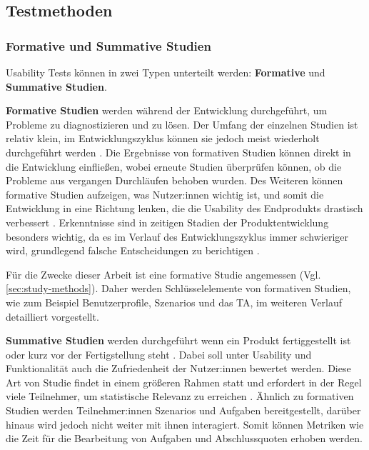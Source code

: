 \subsection{Testmethoden}
\subsubsection{Formative und Summative Studien}
\label{sec:formative-summative}
Usability Tests können in zwei Typen unterteilt werden: \textbf{Formative} und \textbf{Summative
  Studien}.

\vspace{\baselineskip}

\textbf{Formative Studien} werden während der Entwicklung durchgeführt, um Probleme zu diagnostizieren und zu lösen. Der Umfang der einzelnen Studien ist relativ klein, im Entwicklungszyklus können sie jedoch meist wiederholt durchgeführt werden \parencite{barnumUsabilityTesting2021}. Die Ergebnisse von formativen Studien können direkt in die Entwicklung einfließen, wobei erneute Studien überprüfen können, ob die Probleme aus vergangen Durchläufen behoben wurden. Des Weiteren können formative Studien aufzeigen, was Nutzer:innen wichtig ist, und somit die Entwicklung in eine Richtung lenken, die die Usability des Endprodukts drastisch verbessert \parencite{barnumUsabilityTesting2021}. Erkenntnisse sind in zeitigen Stadien der Produktentwicklung besonders wichtig, da es im Verlauf des Entwicklungszyklus immer schwieriger wird, grundlegend falsche Entscheidungen zu berichtigen \parencite{barnumUsabilityTesting2021}.

Für die Zwecke dieser Arbeit ist eine formative Studie angemessen (Vgl. \ref{sec:study-methods}). Daher werden Schlüsselelemente von formativen Studien, wie zum Beispiel Benutzerprofile, Szenarios und das \acl{TA}, im weiteren Verlauf detailliert vorgestellt.

\vspace{\baselineskip}

\textbf{Summative Studien} werden durchgeführt wenn ein Produkt fertiggestellt ist oder kurz vor der Fertigstellung steht \parencite{barnumUsabilityTesting2021}. Dabei soll unter Usability und Funktionalität auch die Zufriedenheit der Nutzer:innen bewertet werden. Diese Art von Studie findet in einem größeren Rahmen statt und erfordert in der Regel viele Teilnehmer, um statistische Relevanz zu erreichen \parencite{barnumUsabilityTesting2021}. Ähnlich zu formativen Studien werden Teilnehmer:innen Szenarios und Aufgaben bereitgestellt, darüber hinaus wird jedoch nicht weiter mit ihnen interagiert. Somit können Metriken wie die Zeit für die Bearbeitung von Aufgaben und Abschlussquoten erhoben werden.

